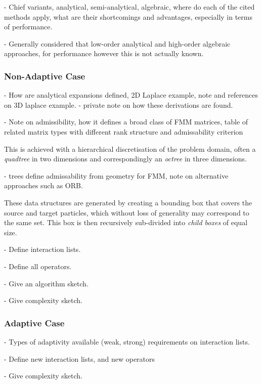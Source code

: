 - Chief variants, analytical, semi-analytical, algebraic, where do each of the cited methods apply, what are their shortcomings and advantages, especially in terms of performance.

- Generally considered that low-order analytical and high-order algebraic approaches, for performance however this is not actually known.


\subsubsection{Non-Adaptive Case}\label{chpt:fmm:sec:generic:sub:uniform}

- How are analytical expansions defined, 2D Laplace example, note and references on 3D laplace example.
    - private note on how these derivations are found.

- Note on admissibility, how it defines a broad class of FMM matrices, table of related matrix types with different rank structure and admissability criterion

This is achieved with a hierarchical discretisation of the problem domain, often a \textit{quadtree} in two dimensions and correspondingly an \textit{octree} in three dimensions.

- trees define admissability from geometry for FMM, note on alternative approaches such as ORB.

These data structures are generated by creating a bounding box that covers the source and target particles, which without loss of generality may correspond to the same set. This box is then recursively sub-divided into \textit{child boxes} of equal size.


- Define interaction lists.

- Define all operators.

- Give an algorithm sketch.

- Give complexity sketch.

\subsubsection{Adaptive Case}\label{chpt:fmm:sec:generic:sub:adaptive}

- Types of adaptivity available (weak, strong) requirements on interaction lists.

- Define new interaction lists, and new operators

- Give complexity sketch.
